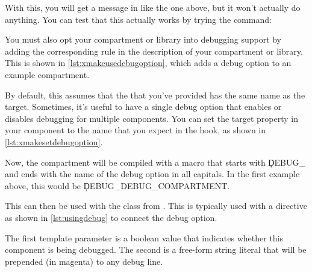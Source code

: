 \lualisting[filename=examples/debug_helpers/xmake.lua,marker=debug_option,label=lst:xmakedebugoption,caption="Build system code for defining a debug option."]{}

With this, you will get a message in    like the one above, but it won't actually do anything.
You can test that this actually works by trying the command:


You must also opt your compartment or library into debugging support by adding the corresponding rule in the description of your compartment or library.
This is shown in \ref{lst:xmakeusedebugoption}, which adds a debug option to an example compartment.

\lualisting[filename=examples/debug_helpers/xmake.lua,marker=use_debug,label=lst:xmakeusedebugoption,caption="Build system code for using a debug option."]{}

By default, this assumes that the  that you've provided has the same name as the target.
Sometimes, it's useful to have a single debug option that enables or disables debugging for multiple components.
You can set the  target property in your component to the name that you expect in the  hook, as shown in \ref{lst:xmakesetdebugoption}.

\lualisting[filename=examples/debug_helpers/xmake.lua,marker=set_debug_option,label=lst:xmakesetdebugoption,caption="Build system code for providing the debug option name explicitly."]{}

Now, the compartment will be compiled with a macro that starts with \c{DEBUG_} and ends with the name of the debug option in all capitals.
In the first example above, this would be \c{DEBUG_DEBUG_COMPARTMENT}.

This can then be used with the  class from .
This is typically used with a  directive as shown in \ref{lst:usingdebug} to connect the debug option.

\codelisting[filename=examples/debug_helpers/example.cc,marker=debug_type,label=lst:usingdebug,caption="Connecting the debug option to a debug type in code"]{}

The first template parameter is a boolean value that indicates whether this component is being debugged.
The second is a free-form string literal that will be prepended (in magenta) to any debug line.

